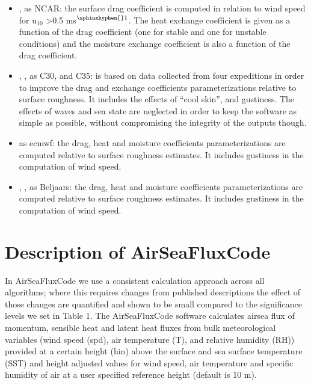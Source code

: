 \documentclass[letterpaper,10pt,english]{sphinxmanual}
\begin{document}
\begin{itemize}
\item {} 
\sphinxAtStartPar
{},  as NCAR: the surface drag coefficient is computed in relation to wind speed for u$_{\text{10}}$ \textgreater{}0.5 ms$^{\text{\sphinxhyphen{}1}}$. The heat exchange coefficient is given as a function of the drag coefficient (one for stable and one for unstable conditions) and the moisture exchange coefficient is also a function of the drag coefficient.

\item {} 
\sphinxAtStartPar
{}, ,  as C30, and C35: is based on data collected from four expeditions in order to improve the drag and exchange coefficients parameterizations relative to surface roughness. It includes the effects of “cool skin”, and gustiness. The effects of waves and sea state are neglected in order to keep the software as simple as possible, without compromising the integrity of the outputs though.

\item {} 
\sphinxAtStartPar
{} as ecmwf: the drag, heat and moisture coefficients parameterizations are computed relative to surface roughness estimates. It includes gustiness in the computation of wind speed.

\item {} 
\sphinxAtStartPar
{}, ,  as Beljaars: the drag, heat and moisture coefficients parameterizations are computed relative to surface roughness estimates. It includes gustiness in the computation of wind speed.

\end{itemize}


\section{Description of AirSeaFluxCode}
\label{\detokenize{users_guide:description-of-airseafluxcode}}
\sphinxAtStartPar
In AirSeaFluxCode we use a consistent calculation approach across all algorithms; where this requires changes from published descriptions the effect of those changes are quantified and shown to be small compared to the significance levels we set in Table 1. The AirSeaFluxCode software calculates air\sphinxhyphen{}sea flux of momentum, sensible heat and latent heat fluxes from bulk meteorological variables (wind speed (spd), air temperature (T), and relative humidity (RH)) provided at a certain height (hin) above the surface and sea surface temperature (SST) and height adjusted values for wind speed, air temperature and specific humidity of air at a user specified reference height (default is 10 m).
\end{document}
